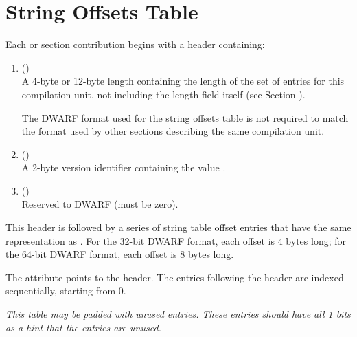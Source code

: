 \section{String Offsets Table}
\label{datarep:stringoffsetstable}
Each 
\bb
\dotdebugstroffsets{} or \dotdebugstroffsetsdwo{} section
contribution
\eb
begins with a header containing:
\begin{enumerate}[1. ]
\item \HFNunitlength{} () \\
A 4-byte or 12-byte length containing the length of
the set of entries for this compilation unit, not
including the length field itself
\bb
(see Section ).
\eb

\bb
The DWARF format used for the string offsets table is not required to match
the format used by other sections describing the same compilation unit.
\eb

\item  \HFNversion{} (\HFTuhalf) \\
A 2-byte version identifier containing the value
\versiondotdebugstroffsets{}.

\item \HFNpadding{} (\HFTuhalf) \\
Reserved to DWARF (must be zero).
\end{enumerate}

This header is followed by a series of string table 
\bb
offset entries
\eb
that have the same representation as \DWFORMstrp.
For the 32-bit DWARF format, each offset is 4 bytes long; for
the 64-bit DWARF format, each offset is 8 bytes long.

The 
\bb
\DWATstroffsets{} attribute points to the header.
\eb
The entries following the header are indexed sequentially,
\db
starting from 0.

\bb
\textit{This table may be padded with unused entries. 
These entries should have all 1 bits as a hint that the 
entries are unused.}
\eb

